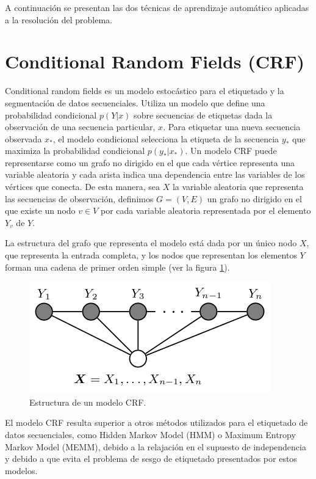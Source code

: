 \documentclass[runningheads,a4paper]{llncs}
\begin{document}
A continuación se presentan las dos técnicas de aprendizaje automático aplicadas a la resolución del problema.

\section{Conditional Random Fields (CRF)}
\label{sec:CRF}

Conditional random fields\cite{LAFFERTY01} es un modelo estocástico para el etiquetado y la segmentación de datos secuenciales. Utiliza un modelo que define una probabilidad condicional $p(Y|x)$ sobre secuencias de etiquetas dada la observación de una secuencia particular, $x$. Para etiquetar una nueva secuencia observada $x_*$, el modelo condicional selecciona la etiqueta de la secuencia $y_*$ que maximiza la probabilidad condicional $p(y_*|x_*)$. Un modelo CRF puede representarse como un grafo no dirigido en el que cada vértice representa una variable aleatoria y cada arista indica una dependencia entre las variables de los vértices que conecta. De esta manera, sea $X$ la variable aleatoria que representa las secuencias de observaci\'on, definimos $G=(V,E)$ un grafo no dirigido en el que existe un nodo $v \in V$ por cada variable aleatoria representada por el elemento $Y_v$ de $Y$. 

La estructura del grafo que representa el modelo está dada por un único nodo $X$, que representa la entrada completa, y los nodos que representan los elementos $Y$ forman una cadena de primer orden simple (ver la figura \ref{fig:CRF}).

\begin{figure}[ht]
	\centering
	\includegraphics[scale=0.5]{crf.png}
	\caption{Estructura de un modelo CRF.}
	\label{fig:CRF}
\end{figure}

El modelo CRF resulta superior a otros métodos utilizados para el etiquetado de datos secuenciales, como Hidden Markov Model (HMM) o Maximum Entropy Markov Model (MEMM), debido a la relajación en el supuesto de independencia y debido a que evita el problema de sesgo de etiquetado presentados por estos modelos\cite{WALLACH04}.
\end{document}

